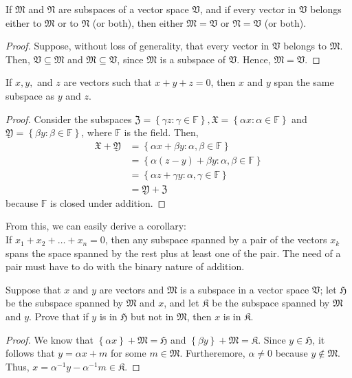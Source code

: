 \documentclass[12pt]{article}
\newenvironment{problem}[2][Problem]{\begin{trivlist} \item[\hskip \labelsep {\bfseries #1}\hskip \labelsep {\bfseries #2.}]}{\end{trivlist}}
\begin{document}
\begin{problem}{2}
  If $\mathfrak{M}$ and $\mathfrak{N}$ are subspaces of a vector space $\mathfrak{V}$, and if every vector in $\mathfrak{V}$ belongs either to $\mathfrak{M}$ or to $\mathfrak{N}$ (or both), then either $\mathfrak{M} = \mathfrak{V}$ or $\mathfrak{N} = \mathfrak{V}$ (or both).
\begin{proof}
  Suppose, without loss of generality, that every vector in $\mathfrak{V}$ belongs to $\mathfrak{M}$. Then, $\mathfrak{V}\subseteq \mathfrak{M}$ and $\mathfrak{M}\subseteq \mathfrak{V}$, since $\mathfrak{M}$ is a subspace of $\mathfrak{V}$. Hence, $\mathfrak{M}=\mathfrak{V}$. 
\end{proof}
\end{problem}
\begin{problem}{3}
  If $x,y,$ and $z$ are vectors such that $x+y+z=0$, then $x$ and $y$ span the same subspace as $y$ and $z$.
\begin{proof}
  Consider the subspaces $\mathfrak{Z} = \left\{ \gamma z : \gamma \in \mathbb{F} \right\}, \mathfrak{X} = \left\{ \alpha x : \alpha\in \mathbb{F}\right\}$ and $\mathfrak{Y} = \left\{ \beta y : \beta\in \mathbb{F}\right\}$, where $\mathbb{F}$ is the field. Then, 
\begin{align*}
  \mathfrak{X}+\mathfrak{Y} &= \left\{ \alpha x + \beta y : \alpha,\beta\in \mathbb{F}\right\}\\
  &= \left\{ \alpha(z-y)+\beta y : \alpha,\beta\in \mathbb{F} \right\} \\
  &= \left\{ \alpha z + \gamma y: \alpha,\gamma\in \mathbb{F} \right\}\\
  &= \mathfrak{Y}+\mathfrak{Z}
\end{align*}
because $\mathbb{F}$ is closed under addition. 
\end{proof}
From this, we can easily derive a corollary:\\

If $x_{1}+x_{2}+\dots+x_{n} = 0$, then any subspace spanned by a pair of the vectors $x_{k}$ spans the space spanned by the rest plus at least one of the pair. The need of a pair must have to do with the binary nature of addition. 
\end{problem}
\begin{problem}{4}
  Suppose that $x$ and $y$ are vectors and $\mathfrak{M}$ is a subspace in a vector space $\mathfrak{V}$; let $\mathfrak{H}$ be the subspace spanned by $\mathfrak{M}$ and $x$, and let $\mathfrak{K}$ be the subspace spanned by $\mathfrak{M}$ and $y$. Prove that if $y$ is in $\mathfrak{H}$ but not in $\mathfrak{M}$, then $x$ is in $\mathfrak{K}$. 
\begin{proof}
  We know that $\left\{ \alpha x \right\} + \mathfrak{M} = \mathfrak{H}$ and $\left\{ \beta y \right\} + \mathfrak{M} = \mathfrak{K}$. Since $y\in \mathfrak{H}$, it follows that $y= \alpha x+ m$ for some $m\in \mathfrak{M}$. Furtheremore, $\alpha \neq 0$ because $y\not\in \mathfrak{M}$. Thus, $x = \alpha^{-1} y - \alpha^{-1} m \in \mathfrak{K}$.
\end{proof}
\end{problem}
\end{document}
